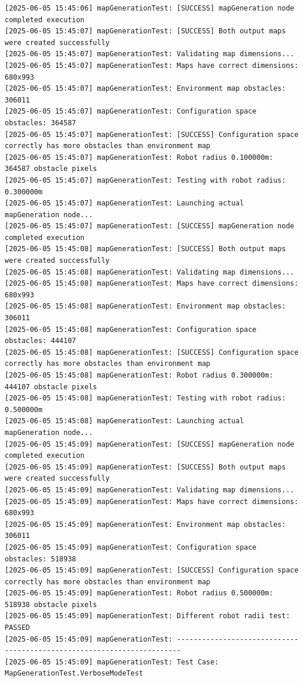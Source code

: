 \documentclass{CSSRforAfrica}
\begin{document}
\begin{landscape}
\begin{verbatim}
[2025-06-05 15:45:06] mapGenerationTest: [SUCCESS] mapGeneration node completed execution
[2025-06-05 15:45:07] mapGenerationTest: [SUCCESS] Both output maps were created successfully
[2025-06-05 15:45:07] mapGenerationTest: Validating map dimensions...
[2025-06-05 15:45:07] mapGenerationTest: Maps have correct dimensions: 680x993
[2025-06-05 15:45:07] mapGenerationTest: Environment map obstacles: 306011
[2025-06-05 15:45:07] mapGenerationTest: Configuration space obstacles: 364587
[2025-06-05 15:45:07] mapGenerationTest: [SUCCESS] Configuration space correctly has more obstacles than environment map
[2025-06-05 15:45:07] mapGenerationTest: Robot radius 0.100000m: 364587 obstacle pixels
[2025-06-05 15:45:07] mapGenerationTest: Testing with robot radius: 0.300000m
[2025-06-05 15:45:07] mapGenerationTest: Launching actual mapGeneration node...
[2025-06-05 15:45:07] mapGenerationTest: [SUCCESS] mapGeneration node completed execution
[2025-06-05 15:45:08] mapGenerationTest: [SUCCESS] Both output maps were created successfully
[2025-06-05 15:45:08] mapGenerationTest: Validating map dimensions...
[2025-06-05 15:45:08] mapGenerationTest: Maps have correct dimensions: 680x993
[2025-06-05 15:45:08] mapGenerationTest: Environment map obstacles: 306011
[2025-06-05 15:45:08] mapGenerationTest: Configuration space obstacles: 444107
[2025-06-05 15:45:08] mapGenerationTest: [SUCCESS] Configuration space correctly has more obstacles than environment map
[2025-06-05 15:45:08] mapGenerationTest: Robot radius 0.300000m: 444107 obstacle pixels
[2025-06-05 15:45:08] mapGenerationTest: Testing with robot radius: 0.500000m
[2025-06-05 15:45:08] mapGenerationTest: Launching actual mapGeneration node...
[2025-06-05 15:45:09] mapGenerationTest: [SUCCESS] mapGeneration node completed execution
[2025-06-05 15:45:09] mapGenerationTest: [SUCCESS] Both output maps were created successfully
[2025-06-05 15:45:09] mapGenerationTest: Validating map dimensions...
[2025-06-05 15:45:09] mapGenerationTest: Maps have correct dimensions: 680x993
[2025-06-05 15:45:09] mapGenerationTest: Environment map obstacles: 306011
[2025-06-05 15:45:09] mapGenerationTest: Configuration space obstacles: 518938
[2025-06-05 15:45:09] mapGenerationTest: [SUCCESS] Configuration space correctly has more obstacles than environment map
[2025-06-05 15:45:09] mapGenerationTest: Robot radius 0.500000m: 518938 obstacle pixels
[2025-06-05 15:45:09] mapGenerationTest: Different robot radii test: PASSED
[2025-06-05 15:45:09] mapGenerationTest: -----------------------------------------------------------------------
[2025-06-05 15:45:09] mapGenerationTest: Test Case: MapGenerationTest.VerboseModeTest

\end{verbatim}
\end{landscape}
\end{document}
